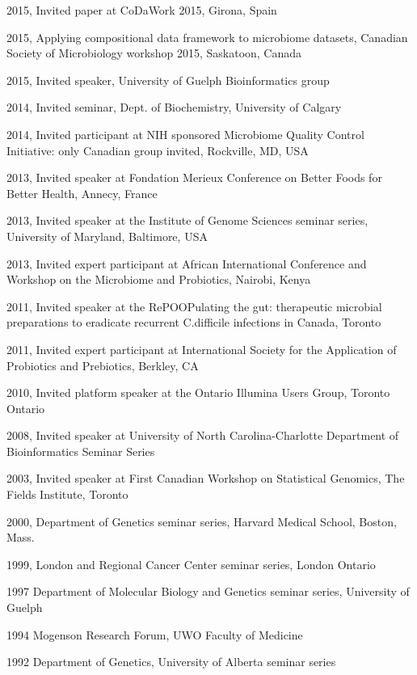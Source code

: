 \documentclass[11pt]{article}
\begin{document}
\begin{description}
\item 2015,  Invited paper at CoDaWork 2015, Girona, Spain
\item 2015,  Applying compositional data framework to microbiome datasets,  Canadian Society of Microbiology workshop 2015, Saskatoon, Canada
\item 2015,  Invited speaker, University of Guelph Bioinformatics group
\item 2014,     Invited seminar, Dept. of Biochemistry, University of Calgary
\item 2014, 	Invited participant at NIH sponsored Microbiome Quality Control Initiative: only Canadian group invited, Rockville, MD, USA
\item 2013, 	Invited speaker at Fondation Merieux Conference on Better Foods for Better Health, Annecy, France
\item 2013, 	Invited speaker at the Institute of Genome Sciences seminar series, University of Maryland, Baltimore, USA
\item 2013, 	Invited expert participant at African International Conference and Workshop on the Microbiome and Probiotics, Nairobi, Kenya
\item 2011, 	Invited speaker at the RePOOPulating the gut: therapeutic microbial preparations to eradicate recurrent C.difficile infections in Canada, Toronto
\item 2011, 	Invited expert participant at International Society for the Application of Probiotics and Prebiotics, Berkley, CA
\item 2010, 	Invited platform speaker at the Ontario Illumina Users Group, Toronto Ontario 
\item 2008, 	Invited speaker at University of North Carolina-Charlotte Department of Bioinformatics Seminar Series
\item 2003, Invited speaker at First Canadian Workshop on Statistical Genomics, The Fields Institute, Toronto 
\item 2000,	 Department of Genetics seminar series, Harvard Medical School, Boston, Mass.
\item 1999,	 London and Regional Cancer Center seminar series, London Ontario
\item  1997	Department of Molecular Biology and Genetics seminar series, 	University of Guelph
\item 1994	 Mogenson Research Forum, UWO 	Faculty of Medicine
\item 1992	Department of Genetics, University of 	Alberta seminar series\\

\end{description}
\end{document}
